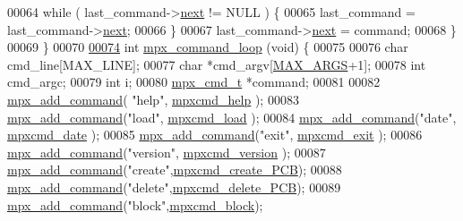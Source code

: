 \begin{DoxyCode}
00064                 \textcolor{keywordflow}{while} ( last\_command->\hyperlink{structmpx__cmd_a863c991d0d31b283791615b5f5fe03bb}{next} != NULL ) \{ 
00065                         last\_command = last\_command->\hyperlink{structmpx__cmd_a863c991d0d31b283791615b5f5fe03bb}{next};
00066                 \}
00067                 last\_command->\hyperlink{structmpx__cmd_a863c991d0d31b283791615b5f5fe03bb}{next} = command;
00068         \}
00069 \}
00070 
\hypertarget{_m_p_x___c_m_d_8_c_source_l00074}{}\hyperlink{mpx__cmd_8h_ab2f64c5ce0432edca230a87739501703}{00074} \textcolor{keywordtype}{int} \hyperlink{_m_p_x___c_m_d_8_c_ab2f64c5ce0432edca230a87739501703}{mpx_command_loop} (\textcolor{keywordtype}{void}) \{
00075 
00076         \textcolor{keywordtype}{char} cmd\_line[MAX\_LINE];
00077         \textcolor{keywordtype}{char} *cmd\_argv[\hyperlink{mpx__cmd_8h_a29b7451465deac204c5f7cb1f9c6e1fc}{MAX_ARGS}+1];
00078         \textcolor{keywordtype}{int}  cmd\_argc;
00079         \textcolor{keywordtype}{int}  i;
00080         \hyperlink{structmpx__cmd}{mpx_cmd_t} *command;
00081 
00082         \hyperlink{_m_p_x___c_m_d_8_c_a52c02eb85fda9ac4278e10088a192e89}{mpx_add_command}( \textcolor{stringliteral}{"help"}, \hyperlink{_m_p_x___c_m_d_8_c_ae9b1349cfcfc34815e87cae5330660e8}{mpxcmd_help} );
00083         \hyperlink{_m_p_x___c_m_d_8_c_a52c02eb85fda9ac4278e10088a192e89}{mpx_add_command}(\textcolor{stringliteral}{"load"}, \hyperlink{_m_p_x___c_m_d_8_c_ab121952706478a3ce5951ab91298d391}{mpxcmd_load} );
00084         \hyperlink{_m_p_x___c_m_d_8_c_a52c02eb85fda9ac4278e10088a192e89}{mpx_add_command}(\textcolor{stringliteral}{"date"}, \hyperlink{_m_p_x___c_m_d_8_c_a8959742dda38733f33da60a56cb07373}{mpxcmd_date} );
00085         \hyperlink{_m_p_x___c_m_d_8_c_a52c02eb85fda9ac4278e10088a192e89}{mpx_add_command}(\textcolor{stringliteral}{"exit"}, \hyperlink{_m_p_x___c_m_d_8_c_ac303fbf0480d6050f91c6d7ac960d00c}{mpxcmd_exit} );
00086         \hyperlink{_m_p_x___c_m_d_8_c_a52c02eb85fda9ac4278e10088a192e89}{mpx_add_command}(\textcolor{stringliteral}{"version"}, \hyperlink{_m_p_x___c_m_d_8_c_a70a1ce3926ea7c41321ab42b4161df0d}{mpxcmd_version} );
00087         \hyperlink{_m_p_x___c_m_d_8_c_a52c02eb85fda9ac4278e10088a192e89}{mpx_add_command}(\textcolor{stringliteral}{"create"},\hyperlink{mpx__r2_8c_a782285c58822e411fb75be1e65fe1104}{mpxcmd_create_PCB});
00088         \hyperlink{_m_p_x___c_m_d_8_c_a52c02eb85fda9ac4278e10088a192e89}{mpx_add_command}(\textcolor{stringliteral}{"delete"},\hyperlink{mpx__r2_8c_ae6d6afa9fefa158029528a24841c453a}{mpxcmd_delete_PCB});
00089         \hyperlink{_m_p_x___c_m_d_8_c_a52c02eb85fda9ac4278e10088a192e89}{mpx_add_command}(\textcolor{stringliteral}{"block"},\hyperlink{mpx__r2_8c_ae8eb72663ecff92c27ab06e3560fd0d4}{mpxcmd_block});

\end{DoxyCode}
